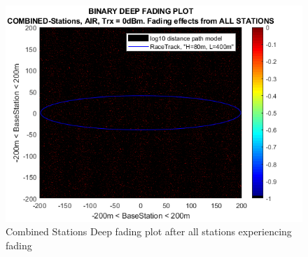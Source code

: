 \begin{figure}[h]
	\centering
	\includegraphics[width=\linewidth]{theory/fading/fig/binaryDeepFading_combinedStations_allStations.png}
	\caption{Combined Stations Deep fading plot after all stations experiencing fading}
	\label{fig:binaryDeepFading_combinedStations_allStations}
\end{figure}

